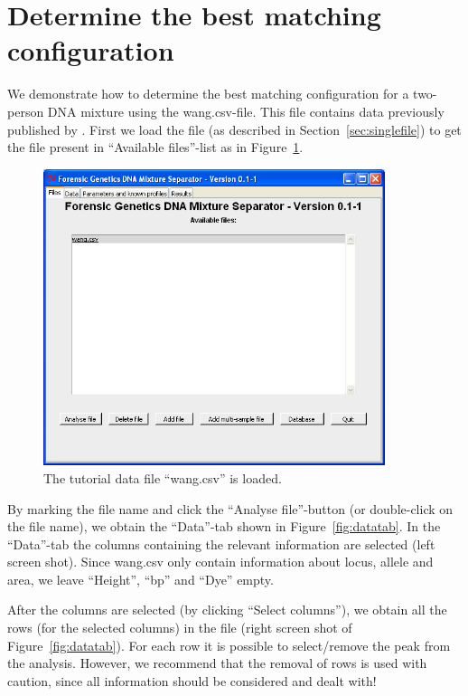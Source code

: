 \documentclass[a4paper,11pt]{article}
\begin{document}
\newpage

\section{Determine the best matching configuration}
\label{sec:wangbm}

We demonstrate how to determine the best matching configuration for a
two-person DNA mixture using the wang.csv-file. This file contains
data previously published by \citet{wang2006}. First we load the file
(as described in Section~\ref{sec:singlefile}) to get the file present
in ``Available files''-list as in Figure~\ref{fig:wangload}.

\begin{figure}[!h]
  \centering
  \includegraphics[width=10cm]{files_singlefile}
  \caption{\label{fig:wangload}The tutorial data file ``wang.csv'' is loaded.}
\end{figure}

By marking the file name and click the ``Analyse file''-button (or
double-click on the file name), we obtain the ``Data''-tab shown in
Figure~\ref{fig:datatab}. In the ``Data''-tab the columns containing
the relevant information are selected (left screen shot). Since
wang.csv only contain information about locus, allele and area, we
leave ``Height'', ``bp'' and ``Dye'' empty.

After the columns are selected (by clicking ``Select columns''), we
obtain all the rows (for the selected columns) in the file (right
screen shot of Figure~\ref{fig:datatab}). For each row it is possible
to select/remove the peak from the analysis. However, we recommend
that the removal of rows is used with caution, since all information
should be considered and dealt with!
\end{document}
